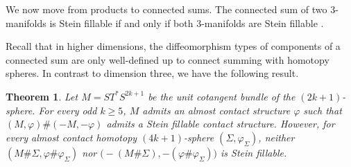 \documentclass[12pt]{amsart}
\newcommand\acs{\varphi}  				%
\newtheorem{Theorem}{Theorem}[section]
\theoremstyle{remark}
\newcommand{\jbcomm}[1]{\begingroup\color{green}JB:~#1\endgroup}
\begin{document}
We now move from products to connected sums.
The connected sum of two 3-manifolds is Stein fillable if and only if
both 3-manifolds are Stein fillable \cite{Eliashberg90}. 
\begin{comment}
To state the result, recall that an $n$-manifold $\Sigma$ is a
\emph{homotopy sphere} if it is homotopy equivalent to the
$n$-dimensional sphere $S^n$. By \cite{Smale61} a homotopy sphere is
homeomorphic to $S^n$, but the smooth structure of $\Sigma$ might be
different from the smooth structure of $S^n$. Indeed, according to
\cite{Milnor}, there are \emph{exotic} spheres, that is, homotopy
spheres which are not diffeomorphic to $S^n$.  
\end{comment}
Recall that in higher dimensions, the diffeomorphism types of components of a connected 
sum are only
well-defined up to connect summing with homotopy spheres. In contrast
to dimension three, we have the following result.

\begin{Theorem}\label{thm:mainconnsum}
Let $M = ST^*S^{2k{+}1}$ be the unit cotangent bundle of the
$(2k{+}1)$-sphere.  For every odd $k \geq 5$, $M$ admits an almost
contact structure $\varphi$ such that $(M,\varphi) \# (-M,-\varphi)$
admits a Stein fillable contact structure.  However, for every
almost contact homotopy $(4k{+}1)$-sphere $(\Sigma, \acs_\Sigma)$,
neither $(M \# \Sigma, \varphi \# \varphi_{\Sigma})$ nor 
$\bigl(-(M \# \Sigma), -(\varphi \# \varphi_{\Sigma}) \bigr)$ is Stein fillable.
%
%
%
\end{Theorem}
%
\end{document}
